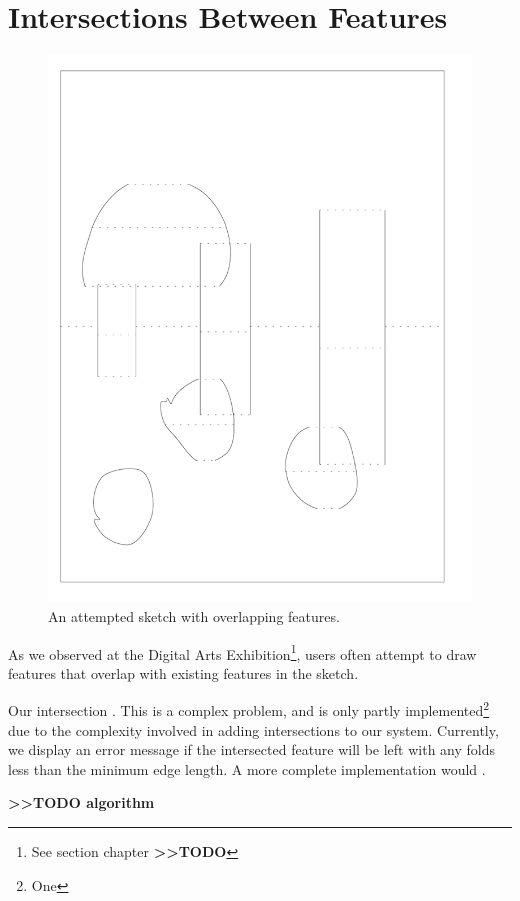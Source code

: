\section{Intersections Between
Features}\label{intersections-between-features}

\begin{figure}[htbp]
\centering
\includegraphics{figures/91_Appendix_DAX_Creations/overlapping_features.png}
\caption{An attempted sketch with overlapping features.}
\end{figure}

As we observed at the Digital Arts Exhibition\footnote{See section
  chapter \textbf{\textgreater{}\textgreater{}TODO}}, users often
attempt to draw features that overlap with existing features in the
sketch.

Our intersection . This is a complex problem, and is only partly
implemented\footnote{One} due to the complexity involved in adding
intersections to our system. Currently, we display an error message if
the intersected feature will be left with any folds less than the
minimum edge length. A more complete implementation would .

\textbf{\textgreater{}\textgreater{}TODO algorithm}
